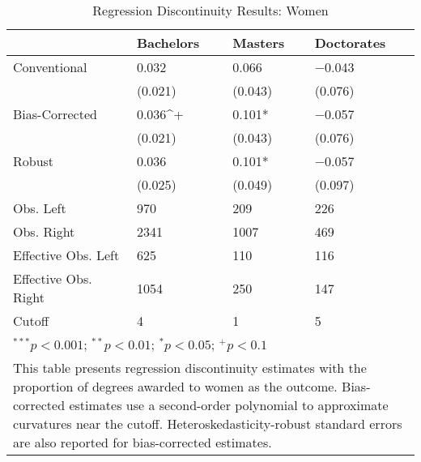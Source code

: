 \begin{table}
\caption{Regression Discontinuity Results: Women}
\centering
\begin{tabularx}{\textwidth}{l>{\centering\arraybackslash}X>{\centering\arraybackslash}X>{\centering\arraybackslash}X}
\toprule
  & Bachelors & Masters & Doctorates\\
\midrule
Conventional & \num{0.032} & \num{0.066} & \num{-0.043}\\
 & (\num{0.021}) & (\num{0.043}) & (\num{0.076})\\
Bias-Corrected & \num{0.036}^+ & \num{0.101}* & \num{-0.057}\\
 & (\num{0.021}) & (\num{0.043}) & (\num{0.076})\\
Robust & \num{0.036} & \num{0.101}* & \num{-0.057}\\
 & (\num{0.025}) & (\num{0.049}) & (\num{0.097})\\
\midrule
Obs. Left & \num{970} & \num{209} & \num{226}\\
Obs. Right & \num{2341} & \num{1007} & \num{469}\\
Effective Obs. Left & \num{625} & \num{110} & \num{116}\\
Effective Obs. Right & \num{1054} & \num{250} & \num{147}\\
Cutoff & \num{4} & \num{1} & \num{5}\\
\bottomrule
\multicolumn{4}{l}{\scriptsize \rule{0pt}{1em}$^{***}p<0.001$; $^{**}p<0.01$; $^{*}p<0.05$; $^{+}p<0.1$}\\
\multicolumn{4}{p{\textwidth}}{\scriptsize \rule{0pt}{1em}This table presents regression discontinuity estimates with the proportion of degrees awarded to women as the outcome. Bias-corrected estimates use a second-order polynomial to approximate curvatures near the cutoff. Heteroskedasticity-robust standard errors are also reported for bias-corrected estimates.}\\
\end{tabularx}
\end{table}

